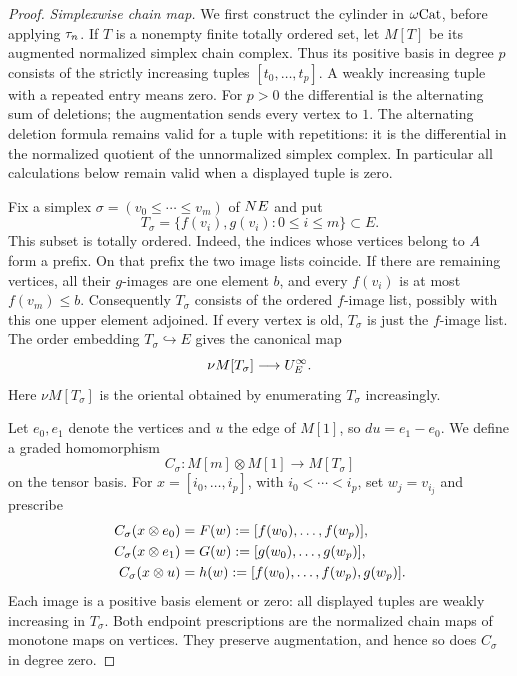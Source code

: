 \begin{proof}
\emph{Simplexwise chain map.}
We first construct the cylinder in $\omega\mathrm{Cat}$, before applying
$\tau_n$.  If $T$ is a nonempty finite totally ordered set, let $M[T]$
be its augmented normalized simplex chain complex.  Thus its positive
basis in degree $p$ consists of the strictly increasing tuples
$[t_0,\ldots,t_p]$.  A weakly increasing tuple with a repeated entry
means zero.  For $p>0$ the differential is the alternating sum of
deletions; the augmentation sends every vertex to $1$.
The alternating deletion formula remains valid for a tuple with
repetitions: it is the differential in the normalized quotient of the
unnormalized simplex complex.  In particular all calculations below
remain valid when a displayed tuple is zero.

Fix a simplex $\sigma=(v_0\le\cdots\le v_m)$ of $N E$ and put
\[
 T_\sigma=\{f(v_i),g(v_i):0\le i\le m\}\subset E.
\]
This subset is totally ordered.  Indeed, the indices whose vertices
belong to $A$ form a prefix.  On that prefix the two image lists
coincide.  If there are remaining vertices, all their $g$-images are
one element $b$, and every $f(v_i)$ is at most $f(v_m)\le b$.
Consequently $T_\sigma$ consists of the ordered $f$-image list,
possibly with this one upper element adjoined.  If every vertex is
old, $T_\sigma$ is just the $f$-image list.
The order embedding $T_\sigma\hookrightarrow E$ gives the canonical
map
\[
 \nu M[T_\sigma]\longrightarrow U^{\infty}_{E}.
\]
Here $\nu M[T_\sigma]$ is the oriental obtained by enumerating
$T_\sigma$ increasingly.

Let $e_0,e_1$ denote the vertices and $u$ the edge of $M[1]$, so
$du=e_1-e_0$.  We define a graded homomorphism
\begin{equation}\label{eq:prism-chain-map}
 C_\sigma:M[m]\otimes M[1]\longrightarrow M[T_\sigma]
\end{equation}
on the tensor basis.  For $x=[i_0,\ldots,i_p]$, with
$i_0<\cdots<i_p$, set $w_j=v_{i_j}$ and prescribe
\begin{align}
 C_\sigma(x\otimes e_0)&=F(w):=[f(w_0),\ldots,f(w_p)],\notag\\
 C_\sigma(x\otimes e_1)&=G(w):=[g(w_0),\ldots,g(w_p)],\label{eq:prism-basis}\\
 C_\sigma(x\otimes u)&=h(w):=[f(w_0),\ldots,f(w_p),g(w_p)].\notag
\end{align}
Each image is a positive basis element or zero: all displayed tuples
are weakly increasing in $T_\sigma$.
Both endpoint prescriptions are the normalized chain maps of monotone
maps on vertices.  They preserve augmentation, and hence so does
$C_\sigma$ in degree zero.


\end{proof}
